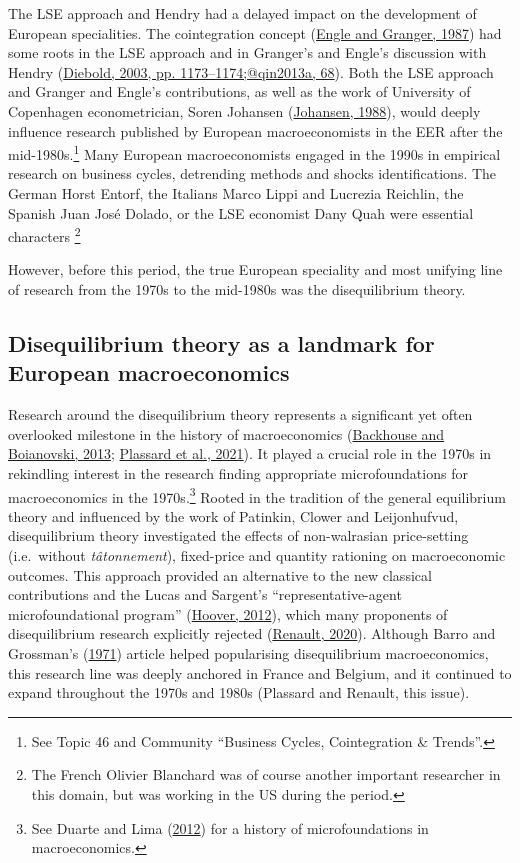 \documentclass[
  12pt,
  onecolumn]{article}
\begin{document}
The LSE approach and Hendry had a delayed impact on the development of
European specialities. The cointegration concept
(\protect\hyperlink{ref-engle1987}{Engle and Granger, 1987}) had some
roots in the LSE approach and in Granger's and Engle's discussion with
Hendry (\protect\hyperlink{ref-diebold2003}{Diebold, 2003, pp.
1173--1174;@qin2013a, 68}). Both the LSE approach and Granger and
Engle's contributions, as well as the work of University of Copenhagen
econometrician, Soren Johansen
(\protect\hyperlink{ref-johansen1988}{Johansen, 1988}), would deeply
influence research published by European macroeconomists in the EER
after the mid-1980s.\footnote{See Topic 46 and Community ``Business
  Cycles, Cointegration \& Trends''.} Many European macroeconomists
engaged in the 1990s in empirical research on business cycles,
detrending methods and shocks identifications. The German Horst Entorf,
the Italians Marco Lippi and Lucrezia Reichlin, the Spanish Juan José
Dolado, or the LSE economist Dany Quah were essential characters
\footnote{The French Olivier Blanchard was of course another important
  researcher in this domain, but was working in the US during the
  period.}

However, before this period, the true European speciality and most
unifying line of research from the 1970s to the mid-1980s was the
disequilibrium theory.

\hypertarget{disequilibrium}{%
\subsection{Disequilibrium theory as a landmark for European
macroeconomics}\label{disequilibrium}}

Research around the disequilibrium theory represents a significant yet
often overlooked milestone in the history of macroeconomics
(\protect\hyperlink{ref-backhouseboianovski2013}{Backhouse and
Boianovski, 2013}; \protect\hyperlink{ref-plassard2021}{Plassard et al.,
2021}). It played a crucial role in the 1970s in rekindling interest in
the research finding appropriate microfoundations for macroeconomics in
the 1970s.\footnote{See Duarte and Lima
  (\protect\hyperlink{ref-duartelima2012a}{2012}) for a history of
  microfoundations in macroeconomics.} Rooted in the tradition of the
general equilibrium theory and influenced by the work of Patinkin,
Clower and Leijonhufvud, disequilibrium theory investigated the effects
of non-walrasian price-setting (i.e.~without \emph{tâtonnement}),
fixed-price and quantity rationing on macroeconomic outcomes. This
approach provided an alternative to the new classical contributions and
the Lucas and Sargent's ``representative-agent microfoundational
program'' (\protect\hyperlink{ref-hoover2012}{Hoover, 2012}), which many
proponents of disequilibrium research explicitly rejected
(\protect\hyperlink{ref-renault2020a}{Renault, 2020}). Although Barro
and Grossman's (\protect\hyperlink{ref-barro1971}{1971}) article helped
popularising disequilibrium macroeconomics, this research line was
deeply anchored in France and Belgium, and it continued to expand
throughout the 1970s and 1980s (Plassard and Renault, this issue).
\end{document}
